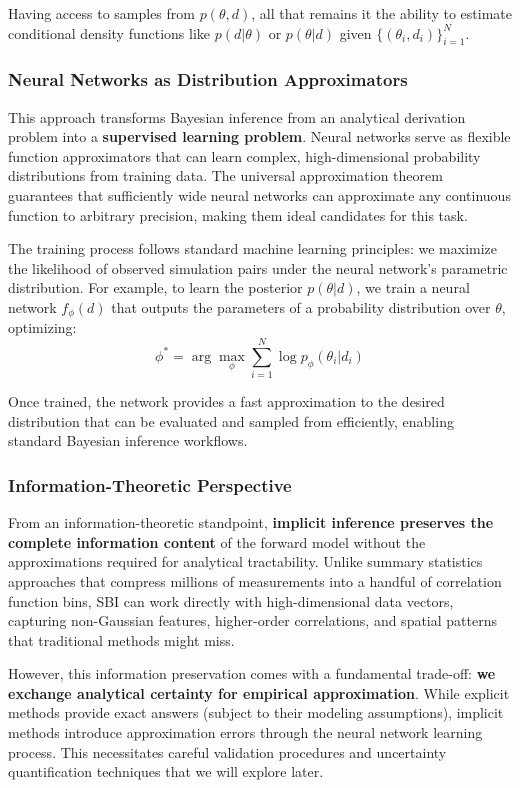 \documentclass{SciPost}
\begin{document}
Having access to samples from $p(\theta, d)$, all that remains it the ability to estimate conditional density functions like $p(d|\theta)$ or $p(\theta|d)$ given $\{(\theta_i, d_i)\}_{i=1}^N$.

\subsubsection{Neural Networks as Distribution Approximators}

This approach transforms Bayesian inference from an analytical derivation problem into a \textbf{supervised learning problem}. Neural networks serve as flexible function approximators that can learn complex, high-dimensional probability distributions from training data. The universal approximation theorem guarantees that sufficiently wide neural networks can approximate any continuous function to arbitrary precision, making them ideal candidates for this task.

The training process follows standard machine learning principles: we maximize the likelihood of observed simulation pairs under the neural network's parametric distribution. For example, to learn the posterior $p(\theta|d)$, we train a neural network $f_\phi(d)$ that outputs the parameters of a probability distribution over $\theta$, optimizing:
\begin{equation}
    \phi^* = \arg\max_\phi \sum_{i=1}^N \log p_\phi(\theta_i | d_i)
\end{equation}

Once trained, the network provides a fast approximation to the desired distribution that can be evaluated and sampled from efficiently, enabling standard Bayesian inference workflows.

\subsubsection{Information-Theoretic Perspective}

From an information-theoretic standpoint, \textbf{implicit inference preserves the complete information content} of the forward model without the approximations required for analytical tractability. Unlike summary statistics approaches that compress millions of measurements into a handful of correlation function bins, SBI can work directly with high-dimensional data vectors, capturing non-Gaussian features, higher-order correlations, and spatial patterns that traditional methods might miss.

However, this information preservation comes with a fundamental trade-off: \textbf{we exchange analytical certainty for empirical approximation}. While explicit methods provide exact answers (subject to their modeling assumptions), implicit methods introduce approximation errors through the neural network learning process. This necessitates careful validation procedures and uncertainty quantification techniques that we will explore later.
\end{document}

